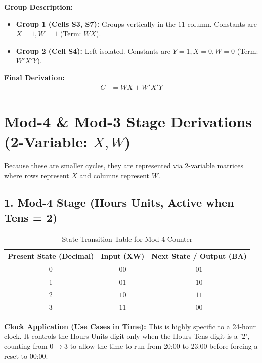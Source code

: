 \documentclass[journal,12pt,onecolumn]{IEEEtran}
\begin{document}
		\begin{justify}
			\textbf{Group Description:}
			\begin{itemize}
				\item \textbf{Group 1 (Cells S3, S7):} Groups vertically in the $11$ column. Constants are $X=1, W=1$ (Term: $WX$).
				\item \textbf{Group 2 (Cell S4):} Left isolated. Constants are $Y=1, X=0, W=0$ (Term: $W'X'Y$).
			\end{itemize}
			
			\textbf{Final Derivation:}
			\begin{align}
				C &= WX + W'X'Y
			\end{align}
		\end{justify}
		
		\newpage
		\section{\textbf{ Mod-4 \& Mod-3 Stage Derivations (2-Variable: $X, W$)}}
		\begin{justify}
			Because these are smaller cycles, they are represented via 2-variable matrices where rows represent $X$ and columns represent $W$.
		\end{justify}
		
		\vspace{1em}
		\subsection{1. Mod-4 Stage (Hours Units, Active when Tens = 2)}
		
		\begin{table}[H]
			\centering
			\begin{tabular}{|c|c|c|}
				\hline
				\textbf{Present State (Decimal)} & \textbf{Input (XW)} & \textbf{Next State / Output (BA)} \\
				\hline
				0 & $00$ & $01$ \\
				\hline
				1 & $01$ & $10$ \\
				\hline
				2 & $10$ & $11$ \\
				\hline
				3 & $11$ & $00$ \\
				\hline
			\end{tabular}
			\caption{State Transition Table for Mod-4 Counter}
		\end{table}
		
		\begin{justify}
			\textbf{Clock Application (Use Cases in Time):} This is highly specific to a 24-hour clock. It controls the Hours Units digit only when the Hours Tens digit is a '2', counting from $0 \rightarrow 3$ to allow the time to run from 20:00 to 23:00 before forcing a reset to 00:00.
		\end{justify}
		
\end{document}
